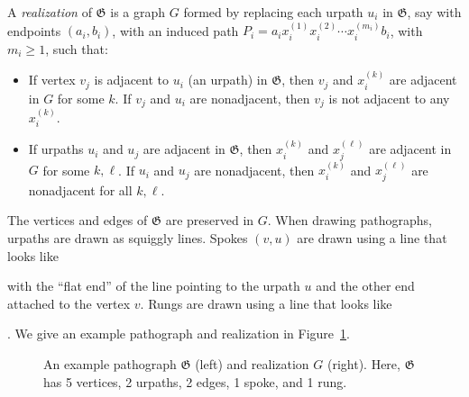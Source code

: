 \documentclass{article}
\renewcommand{\vert}[2]{\node[dot] (#1) at (#2) {};}
\newcommand{\edge}[2]{\draw (#1) -- (#2);}
\newcommand{\urpath}[2]{\draw[decorate,decoration={snake,amplitude=1.5,segment length=10, post length=0,pre length=0}] (#1) -- (#2);}
\newcommand{\spoke}[3]{\draw[-|, shorten >=4pt] (#1) -- ($(#2)!0.5!(#3)$);}
\newcommand{\rung}[4]{\draw[|-|, shorten >=4pt, shorten <=4pt] ($(#1)!0.5!(#2)$) -- ($(#3)!0.5!(#4)$);}
\newcommand{\Gf}{\mathfrak{G}}
\begin{document}
A \textit{realization} of $\Gf$ is a graph $G$ formed by replacing each urpath $u_i$ in $\Gf$, say with endpoints $(a_i,b_i)$, with an induced path $P_i=a_ix_i^{(1)}x_i^{(2)}\cdots x_i^{(m_i)}b_i$, with $m_i\ge 1$, such that:
\begin{itemize}
    \item If vertex $v_j$ is adjacent to $u_i$ (an urpath) in $\Gf$, then $v_j$ and $x_i^{(k)}$ are adjacent in $G$ for some $k$. If $v_j$ and $u_i$ are nonadjacent, then $v_j$ is not adjacent to any $x_i^{(k)}$.
    \item If urpaths $u_i$ and $u_j$ are adjacent in $\Gf$, then $x_i^{(k)}$ and $x_j^{(\ell)}$ are adjacent in $G$ for some $k,\ell$. If $u_i$ and $u_j$ are nonadjacent, then $x_i^{(k)}$ and $x_j^{(\ell)}$ are nonadjacent for all $k,\ell$.
\end{itemize}
The vertices and edges of $\Gf$ are preserved in $G$. When drawing pathographs, urpaths are drawn as squiggly lines. Spokes $(v,u)$ are drawn using a line that looks like  with the ``flat end'' of the line pointing to the urpath $u$ and the other end attached to the vertex $v$. Rungs are drawn using a line that looks like . We give an example pathograph and realization in Figure~\ref{fig:expathograph}.

\begin{figure}[htbp!]
    \centering
    \caption{An example pathograph $\Gf$ (left) and realization $G$ (right). Here, $\Gf$ has 5 vertices, 2 urpaths, 2 edges, 1 spoke, and 1 rung.}
    \label{fig:expathograph}
\end{figure}
\end{document}
